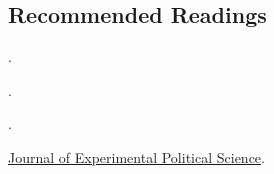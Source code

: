 \documentclass[letterpaper]{article}
\renewenvironment{itemize}{
  \begin{list}{}{
    \setlength{\leftmargin}{1.5em}
  }
}{
  \end{list}
}
\begin{document}
\subsection*{Recommended Readings}

\begin{itemize} 



        \item[$\diamond$] \href{http://www.nber.org/papers/w14690}{}.

        \item[$\diamond$] \href{http:www.aeaweb.org/articles.php?doi=10.1257/jel.48.2.399}{}.


        \item[$\diamond$] \href{https://doi-org.ezproxy.utu.fi/10.1017/CBO9780511762888}{}.


        \item[$\diamond$] \href{https://www.cambridge.org/core/journals/journal-of-experimental-political-science}{Journal of Experimental Political Science}.


        


\end{itemize}
\end{document}
